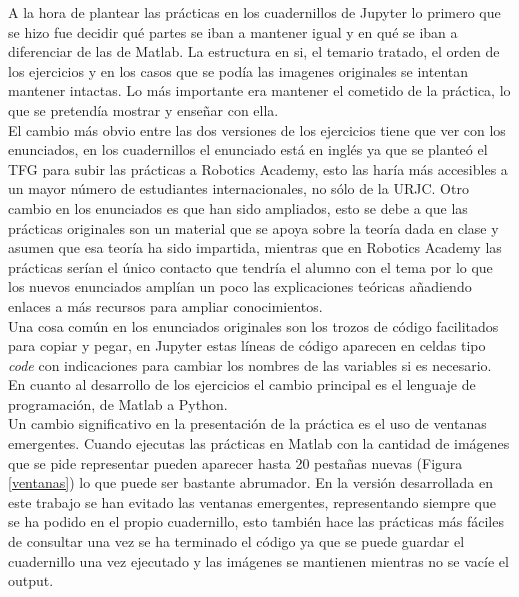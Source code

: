 \documentclass[a4paper,12pt]{report}
\begin{document}
A la hora de plantear las prácticas en los cuadernillos de Jupyter lo primero que se hizo fue decidir qué partes se iban a mantener igual y en qué se iban a diferenciar de las de Matlab. La estructura en si, el temario tratado, el orden de los ejercicios y en los casos que se podía las imagenes originales se intentan mantener intactas. Lo más importante era mantener el cometido de la práctica, lo que se pretendía mostrar y enseñar con ella.\\

El cambio más obvio entre las dos versiones de los ejercicios tiene que ver con los enunciados, en los cuadernillos el enunciado está en inglés ya que se planteó el TFG para subir las prácticas a Robotics Academy, esto las haría más accesibles a un mayor número de estudiantes internacionales, no sólo de la URJC. Otro cambio en los enunciados es que han sido ampliados, esto se debe a que las prácticas originales son un material que se apoya sobre la teoría dada en clase y asumen que esa teoría ha sido impartida, mientras que en Robotics Academy las prácticas serían el único contacto que tendría el alumno con el tema por lo que los nuevos enunciados amplían un poco las explicaciones teóricas añadiendo enlaces a más recursos para ampliar conocimientos.\\

Una cosa común en los enunciados originales son los trozos de código facilitados para copiar y pegar, en Jupyter estas líneas de código aparecen en celdas tipo \emph{code} con indicaciones para cambiar los nombres de las variables si es necesario.\\

En cuanto al desarrollo de los ejercicios el cambio principal es el lenguaje de programación, de Matlab a Python. \\

Un cambio significativo en la presentación de la práctica es el uso de ventanas emergentes. Cuando ejecutas las prácticas en Matlab con la cantidad de imágenes que se pide representar pueden aparecer hasta 20 pestañas nuevas  (Figura \ref{ventanas}) lo que puede ser bastante abrumador. En la versión desarrollada en este trabajo se han evitado las ventanas emergentes, representando siempre que se ha podido en el propio cuadernillo, esto también hace las prácticas más fáciles de consultar una vez se ha terminado el código ya que se puede guardar el cuadernillo una vez ejecutado y las imágenes se mantienen mientras no se vacíe el output.\\
\end{document}
